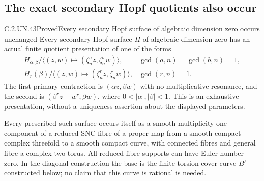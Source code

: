 \subsection{The exact secondary Hopf quotients also occur}

\begin{statement}{C.2.UN.43}{Proved}{Every secondary Hopf surface of algebraic dimension zero occurs unchanged}
Every secondary Hopf surface $H$ of algebraic dimension zero
has an actual finite quotient presentation of one of the forms
\[
\begin{array}{ll}
 H_{\alpha,\beta}/\langle(z,w)\mapsto
          (\zeta_n^a z,\zeta_n^b w)\rangle,
 &\gcd(a,n)=\gcd(b,n)=1,\\[2pt]
 H_r(\beta)/\langle(z,w)\mapsto
          (\zeta_n^r z,\zeta_n w)\rangle,
 &\gcd(r,n)=1.
\end{array}
\tag{C.SH.1}
\]
The first primary contraction is $(\alpha z,\beta w)$ with no
multiplicative resonance, and the second is
$(\beta^r z+w^r,\beta w)$, where $0<|\alpha|,|\beta|<1$.
This is an exhaustive presentation, without a uniqueness
assertion about the displayed parameters.

Every prescribed such surface occurs itself as a smooth
multiplicity-one component of a reduced SNC fibre of a proper
map from a smooth compact complex threefold to a smooth
compact curve, with connected fibres and general fibre a
complex two-torus. All reduced fibre supports can have Euler
number zero. In the diagonal construction the base is the
finite torsion-cover curve $B'$ constructed below; no claim
that this curve is rational is needed.
\end{statement}


